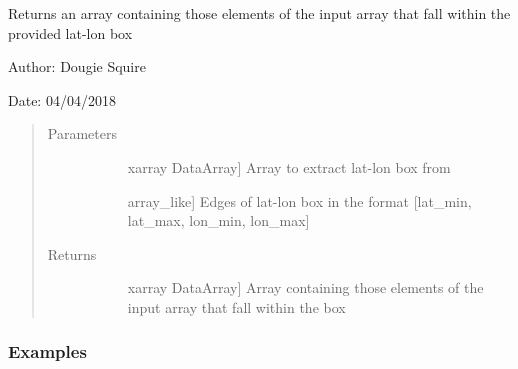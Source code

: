 \documentclass[letterpaper,10pt,english]{sphinxmanual}
\begin{document}
\begin{fulllineitems}
\label{\detokenize{utils_doc:utils.get_latlon_region}}
Returns an array containing those elements of the input array that fall within the provided                lat-lon box

\begin{DUlineblock}{0em}
\item[] Author: Dougie Squire
\item[] Date: 04/04/2018
\end{DUlineblock}
\begin{quote}\begin{description}
\item[{Parameters}] \leavevmode\begin{description}
\item[{}] \leavevmode{[}xarray DataArray{]}
Array to extract lat-lon box from

\item[{}] \leavevmode{[}array\_like{]}
Edges of lat-lon box in the format {[}lat\_min, lat\_max, lon\_min, lon\_max{]}

\end{description}

\item[{Returns}] \leavevmode\begin{description}
\item[{}] \leavevmode{[}xarray DataArray{]}
Array containing those elements of the input array that fall within the box

\end{description}

\end{description}\end{quote}
\subsubsection*{Examples}


\end{fulllineitems}
\end{document}
